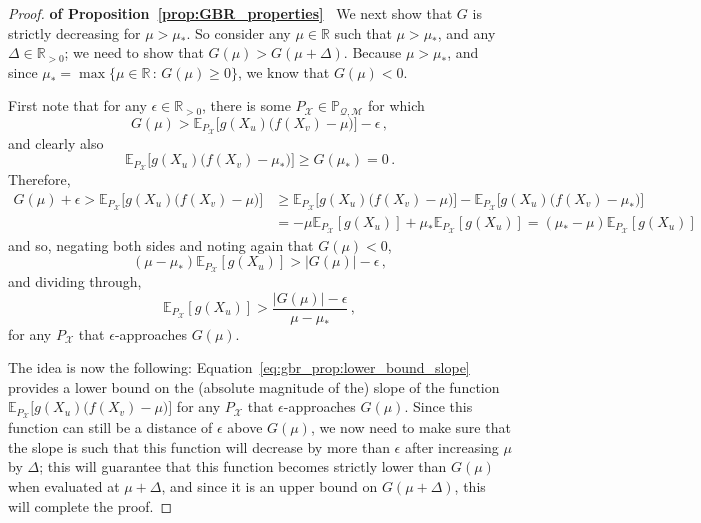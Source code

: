 \documentclass[3p]{elsarticle}
\newcommand{\reals}{\mathbb{R}}
\newcommand{\realspos}{\reals_{>0}}
\newcommand{\states}{\mathcal{X}}
\newcommand{\rateset}{\mathcal{Q}}
\newcommand{\abs}[1]{\left\vert #1 \right\vert}
\begin{document}
\begin{proof}{\bf of Proposition~\ref{prop:GBR_properties}~}
We next show that $G$ is strictly decreasing for $\mu>\mu_*$. So consider any $\mu\in\reals$ such that $\mu>\mu_*$, and any $\Delta\in\realspos$; we need to show that $G(\mu)>G(\mu+\Delta)$. Because $\mu>\mu_*$, and since $\mu_*=\max\{\mu\in\reals\,:\,G(\mu)\geq 0\}$, we know that $G(\mu)<0$.

First note that for any $\epsilon\in\realspos$, there is some $P_{\states}\in\mathbb{P}_{\rateset,\mathcal{M}}$ for which
\begin{equation*}
G(\mu) > \mathbb{E}_{P_\states}\bigl[g(X_u)\bigl(f(X_v)-\mu\bigr)\bigr] - \epsilon\,,
\end{equation*}
and clearly also
\begin{equation*}
\mathbb{E}_{P_\states}\bigl[g(X_u)\bigl(f(X_v)-\mu_*\bigr)\bigr] \geq G(\mu_*) = 0\,.
\end{equation*}
Therefore,
\begin{align*}
G(\mu)+\epsilon > \mathbb{E}_{P_\states}\bigl[g(X_u)\bigl(f(X_v)-\mu\bigr)\bigr] 
 &\geq \mathbb{E}_{P_\states}\bigl[g(X_u)\bigl(f(X_v)-\mu\bigr)\bigr] - \mathbb{E}_{P_\states}\bigl[g(X_u)\bigl(f(X_v)-\mu_*\bigr)\bigr] \\
 &= -\mu\mathbb{E}_{P_\states}[g(X_u)] + \mu_*\mathbb{E}_{P_\states}[g(X_u)]
 = (\mu_*-\mu)\mathbb{E}_{P_\states}[g(X_u)]
\end{align*}
and so, negating both sides and noting again that $G(\mu)<0$,
\begin{equation*}
(\mu-\mu_*)\mathbb{E}_{P_\states}[g(X_u)] > \abs{G(\mu)}-\epsilon\,,
\end{equation*}
and dividing through,
\begin{equation}\label{eq:gbr_prop:lower_bound_slope}
\mathbb{E}_{P_\states}[g(X_u)] > \frac{\abs{G(\mu)}-\epsilon}{\mu-\mu_*}\,,
\end{equation}
for any $P_\states$ that $\epsilon$-approaches $G(\mu)$. 

The idea is now the following: Equation~\eqref{eq:gbr_prop:lower_bound_slope} provides a lower bound on the (absolute magnitude of the) slope of the function $\mathbb{E}_{P_\states}\bigl[g(X_u)\bigl(f(X_v)-\mu\bigr)\bigr]$ for any $P_\states$ that $\epsilon$-approaches $G(\mu)$. Since this function can still be a distance of $\epsilon$ above $G(\mu)$, we now need to make sure that the slope is such that this function will decrease by more than $\epsilon$ after increasing $\mu$ by $\Delta$; this will guarantee that this function becomes strictly lower than $G(\mu)$ when evaluated at $\mu+\Delta$, and since it is an upper bound on $G(\mu+\Delta)$, this will complete the proof.


\end{proof}
\end{document}
